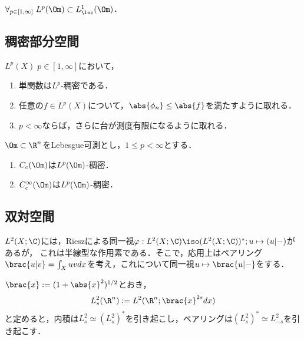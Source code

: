 \documentclass[uplatex, dvipdfmx]{jsreport}
\begin{document}
\begin{corollary}
    $\forall_{p\in[1,\infty]}\;L^p(\Om)\subset L^1_\loc(\Om)$．
\end{corollary}

\subsection{稠密部分空間}

\begin{theorem}[単関数]
    $L^p(X)\;p\in[1,\infty]$において，
    \begin{enumerate}
        \item 単関数は$L^p$-稠密である．
        \item 任意の$f\in L^p(X)$について，$\abs{\phi_n}\le\abs{f}$を満たすように取れる．
        \item $p<\infty$ならば，さらに台が測度有限になるように取れる．
    \end{enumerate}
\end{theorem}

\begin{theorem}[コンパクト台を持つ可微分関数]
    $\Om\subset\R^n$をLebesgue可測とし，$1\le p<\infty$とする．
    \begin{enumerate}
        \item $C_c(\Om)$は$L^p(\Om)$-稠密．
        \item $C_c^\infty(\Om)$は$L^p(\Om)$-稠密．
    \end{enumerate}
\end{theorem}

\subsection{双対空間}

\begin{remark}
    $L^2(X;\C)$には，Rieszによる同一視$\varphi:L^2(X;\C)\iso (L^2(X;\C))^*;u\mapsto (u|-)$があるが，
    これは半線型な作用素である．そこで，応用上はペアリング$\brac{u|v}=\int_Xuvdx$を考え，これについて同一視$u\mapsto\brac{u|-}$をする．
\end{remark}

\begin{example}[重み付き$L^2$-空間]
    $\brac{x}:=(1+\abs{x}^2)^{1/2}$とおき，
    \[L^2_s(\R^n):=L^2(\R^n;\brac{x}^{2s}dx)\]
    と定めると，内積は$L^2_s\simeq (L^2_s)^*$を引き起こし，ペアリングは$(L^2_s)^*\simeq L^2_{-s}$を引き起こす．
\end{example}
\end{document}
